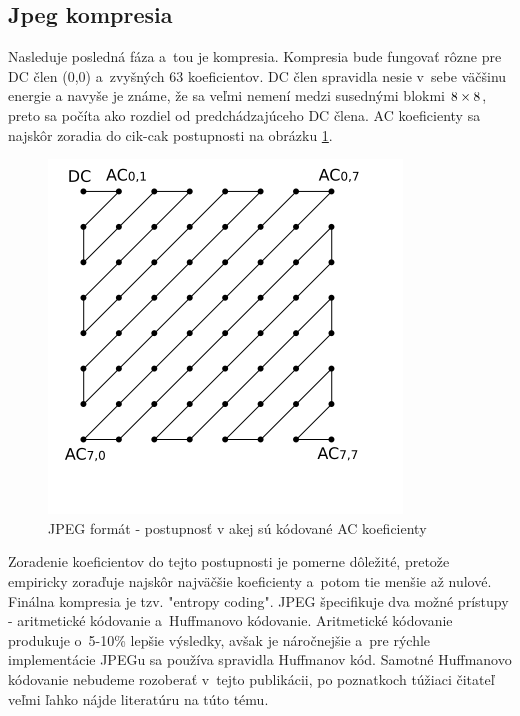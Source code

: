 \subsection{Jpeg kompresia }
Nasleduje posledná fáza a~tou je kompresia. Kompresia bude fungovať
rôzne pre DC člen (0,0) a~zvyšných 63 koeficientov. DC člen spravidla nesie 
v~sebe väčšinu energie a navyše je známe, že sa veľmi nemení medzi
susednými blokmi $8\times8$, preto sa počíta ako rozdiel od predchádzajúceho
DC člena. AC koeficienty sa najskôr zoradia do cik-cak
postupnosti na obrázku \ref{fig:jpeg_zig_zag}. 

\begin{figure}[htp]
    \centering
    \includegraphics{obrazky/informatika/image_compression/zig_zag}
    \caption{JPEG formát - postupnosť v akej sú kódované AC koeficienty}
    \label{fig:jpeg_zig_zag}
\end{figure}

Zoradenie koeficientov
do tejto postupnosti je pomerne dôležité, pretože empiricky zoraďuje
najskôr najväčšie koeficienty a~potom tie menšie až nulové.
Finálna kompresia je tzv. "entropy coding". JPEG špecifikuje dva možné
prístupy - aritmetické kódovanie a~Huffmanovo kódovanie. Aritmetické
kódovanie produkuje o~5-10\% lepšie výsledky, avšak je náročnejšie 
a~pre rýchle implementácie JPEGu sa používa spravidla Huffmanov kód.
Samotné Huffmanovo kódovanie nebudeme rozoberať v~tejto publikácii,
po poznatkoch túžiaci čitateľ veľmi ľahko nájde literatúru na túto
tému.

